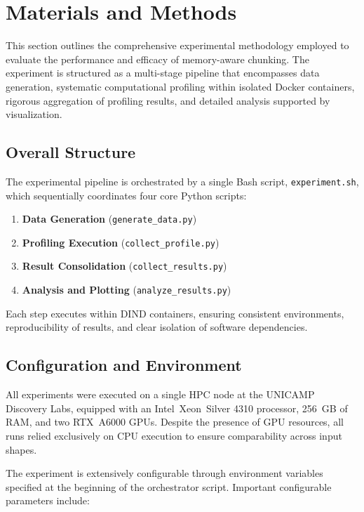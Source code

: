 \section{Materials and Methods}
\label{sec:idp-materials-methods}

This section outlines the comprehensive experimental methodology employed to evaluate the performance and efficacy of memory-aware chunking.
The experiment is structured as a multi-stage pipeline that encompasses data generation, systematic computational profiling within isolated Docker containers, rigorous aggregation of profiling results, and detailed analysis supported by visualization.

\subsection*{Overall Structure}

The experimental pipeline is orchestrated by a single Bash script, \texttt{experiment.sh}, which sequentially coordinates four core Python scripts:

\begin{enumerate}
    \item \textbf{Data Generation} (\texttt{generate\_data.py})
    \item \textbf{Profiling Execution} (\texttt{collect\_profile.py})
    \item \textbf{Result Consolidation} (\texttt{collect\_results.py})
    \item \textbf{Analysis and Plotting} (\texttt{analyze\_results.py})
\end{enumerate}

Each step executes within \ac{DIND} containers, ensuring consistent environments, reproducibility of results, and clear isolation of software dependencies.

\subsection*{Configuration and Environment}

All experiments were executed on a single \ac{HPC} node at the \ac{UNICAMP} Discovery Labs, equipped with an Intel\textregistered\ Xeon\textregistered\ Silver 4310 processor, 256~\ac{GB} of \ac{RAM}, and two \ac{RTX}~A6000 \ac{GPU}s. Despite the presence of \ac{GPU} resources, all runs relied exclusively on \ac{CPU} execution to ensure comparability across input shapes.

The experiment is extensively configurable through environment variables specified at the beginning of the orchestrator script.
Important configurable parameters include:

